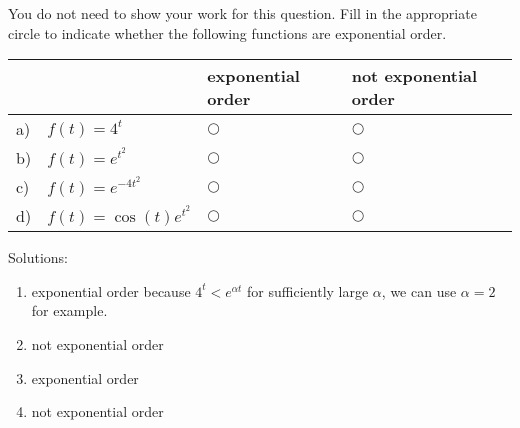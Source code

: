 \ifnum {}  
\question[1] You do not need to show your work for this question. Fill in the appropriate circle to indicate whether the following functions are exponential order. 
\vspace{-0.4cm}
\setlength{\extrarowheight}{0.20cm}
\begin{center}
\hspace{-.9cm}\begin{tabular}{ p{0.20cm} p{4cm} p{3.5cm} p{4cm} }
    & & exponential order &  not exponential order  \\[2pt] \hline 
    a) & $f(t) = 4^t$ & $\bigcirc$  & $\bigcirc$ \\[8pt]  
    b) & $f(t) = e^{t^2}$  & $\bigcirc$  & $\bigcirc$ \\[8pt] 
    c) & $f(t) = e^{-4t^2}$  & $\bigcirc$  & $\bigcirc$ \\[8pt] 
    d) & $f(t) = \cos(t)e^{t^2}$  & $\bigcirc$  & $\bigcirc$ \\[8pt] 
    \hline
\end{tabular}
\end{center}
\setlength{\extrarowheight}{0.0cm}
\ifnum {} {\color{DarkBlue} Solutions: 
\begin{enumerate}[label=(\alph*)]
    \item exponential order because $4^t < e^{\alpha t}$ for sufficiently large $\alpha $, we can use $\alpha = 2$ for example. 
    \item not exponential order
    \item exponential order
    \item not exponential order
\end{enumerate}
}
\fi
\vspace{-6pt} 
\fi 



